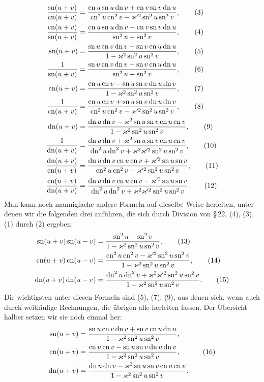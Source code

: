 \documentclass[11pt]{article}
\providecommand{\sn}{\operatorname{sn}}
\providecommand{\cn}{\operatorname{cn}}
\providecommand{\dn}{\operatorname{dn}}
\begin{document}
\begin{align}
{\sn(u+v)\over\cn(u+v)}&=
{\cn u\sn u\dn v+\cn v\sn v\dn u
\over \cn^2u\cn^2v-\varkappa'^2\sn^2u\sn^2v}, \tag{3}\\
{\cn(u+v)\over\sn(u+v)}&=
{\cn u\sn u\dn v-\cn v\sn v\dn u
\over \sn^2u-\sn^2v}, \tag{4}\\
\sn(u+v)&={\sn u\cn v\dn v+\sn v\cn u\dn u
\over 1-\varkappa^2\sn^2u\sn^2v}, \tag{5}\\
{1\over\sn(u+v)}&={\sn u\cn v\dn v-\sn v\cn u\dn u
\over \sn^2u-\sn^2v}, \tag{6}\\
\cn(u+v)&={\cn u\cn v-\sn u\sn v\dn u\dn v
\over 1-\varkappa^2\sn^2u\sn^2v}, \tag{7}\\
{1\over\cn(u+v)}&={\cn u\cn v+\sn u\sn v\dn u\dn v
\over \cn^2u\cn^2v-\varkappa'^2\sn^2u\sn^2v}, \tag{8}\\
\dn(u+v)&={\dn u\dn v-\varkappa^2\sn u\sn v\cn u\cn v
\over 1-\varkappa^2\sn^2u\sn^2v}, \tag{9}\\
{1\over\dn(u+v)}&={\dn u\dn v+\varkappa^2\sn u\sn v\cn u\cn v
\over \dn^2u\dn^2v+\varkappa^2\varkappa'^2\sn^2u\sn^2v}, \tag{10}\\
{\dn(u+v)\over\cn(u+v)}&={\dn u\dn v\cn u\cn v+\varkappa'^2\sn u\sn v
\over \cn^2u\cn^2v-\varkappa'^2\sn^2u\sn^2v}, \tag{11}\\
{\cn(u+v)\over\dn(u+v)}&={\dn u\dn v\cn u\cn v-\varkappa'^2\sn u\sn v
\over \dn^2u\dn^2v+\varkappa^2\varkappa'^2\sn^2u\sn^2v}. \tag{12}
\end{align}
Man kann noch mannigfache andere Formeln auf dieselbe Weise herleiten, unter denen wir die folgenden drei anführen, die sich durch Division von \S\,22, (4), (3), (1) durch (2) ergeben:
\begin{align}
\sn(u+v)\sn(u-v)&={\sn^2u-\sn^2v\over 1-\varkappa^2\sn^2u\sn^2v}, \tag{13}\\
\cn(u+v)\cn(u-v)&={\cn^2u\cn^2v-\varkappa'^2\sn^2u\sn^2v\over 1-\varkappa^2\sn^2u\sn^2v}, \tag{14}\\
\dn(u+v)\dn(u-v)&={\dn^2u\dn^2v+\varkappa^2\varkappa'^2\sn^2u\sn^2v\over 1-\varkappa^2\sn^2u\sn^2v}. \tag{15}
\end{align}
Die wichtigsten unter diesen Formeln sind (5), (7), (9), aus denen sich, wenn auch durch weitläufige Rechnungen, die übrigen alle herleiten lassen. Der Übersicht halber setzen wir sie noch einmal her:
\begin{equation}
\begin{aligned}
\sn(u+v)&={\sn u\cn v\dn v+\sn v\cn u\dn u
\over 1-\varkappa^2\sn^2u\sn^2v},\\
\cn(u+v)&={\cn u\cn v-\sn u\sn v\dn u\dn v
\over 1-\varkappa^2\sn^2u\sn^2v},\\
\dn(u+v)&={\dn u\dn v-\varkappa^2\sn u\sn v\cn u\cn v
\over 1-\varkappa^2\sn^2u\sn^2v}.
\end{aligned}
\tag{16}
\end{equation}
\end{document}
